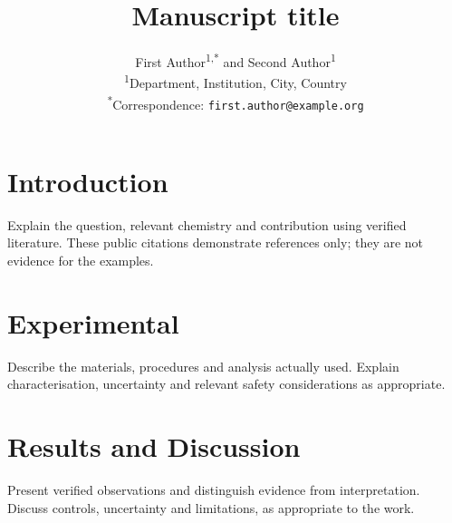 \documentclass[a4paper,10pt,twocolumn]{article}
\title{Manuscript title}
\author{First Author\textsuperscript{1,*} and Second Author\textsuperscript{1}\\
\small \textsuperscript{1}Department, Institution, City, Country\\
\small \textsuperscript{*}Correspondence: \texttt{first.author@example.org}}
\date{}
\begin{document}
\section{Introduction}
Explain the question, relevant chemistry and contribution using verified
literature. These public citations demonstrate references only; they are not
evidence for the examples.\cite{wilkinson2016fair,peng2011reproducible}
\section{Experimental}
Describe the materials, procedures and analysis actually used. Explain
characterisation, uncertainty and relevant safety considerations as appropriate.
\section{Results and Discussion}
Present verified observations and distinguish evidence from interpretation.
Discuss controls, uncertainty and limitations, as appropriate to the work.
\end{document}
